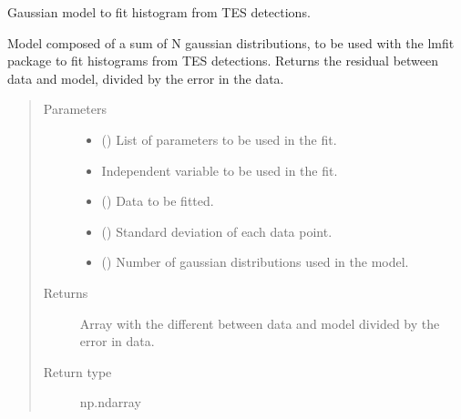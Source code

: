 \documentclass[letterpaper,10pt,english]{sphinxmanual}
\begin{document}

\begin{fulllineitems}
\label{\detokenize{tes:tes.calibration.residual_gauss}}
\sphinxAtStartPar
Gaussian model to fit histogram from TES detections.

\sphinxAtStartPar
Model composed of a sum of N gaussian distributions, to be used
with the lmfit package to fit histograms from TES detections.
Returns the residual between data and model, divided by the
error in the data.
\begin{quote}\begin{description}
\item[{Parameters}] \leavevmode\begin{itemize}
\item {} 
\sphinxAtStartPar
{} () \textendash{} List of parameters to be used in the fit.

\item {} 
\sphinxAtStartPar
{} \textendash{} Independent variable to be used in the fit.

\item {} 
\sphinxAtStartPar
{} () \textendash{} Data to be fitted.

\item {} 
\sphinxAtStartPar
{} () \textendash{} Standard deviation of each data point.

\item {} 
\sphinxAtStartPar
{} () \textendash{} Number of gaussian distributions used in the model.

\end{itemize}

\item[{Returns}] \leavevmode
\sphinxAtStartPar
{} \textendash{} Array with the different between data and model
divided by the error in data.

\item[{Return type}] \leavevmode
\sphinxAtStartPar
np.ndarray

\end{description}\end{quote}

\end{fulllineitems}
\end{document}
